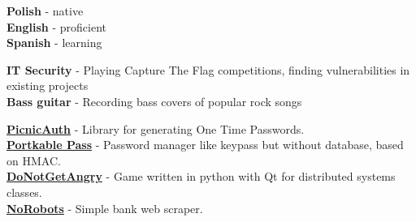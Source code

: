 \documentclass[9pt]{developercv} %
\begin{document}
\begin{minipage}[t]{0.2\textwidth}
	\vspace{-\baselineskip} %


	\textbf{Polish} - native\\
	\textbf{English} - proficient\\
	\textbf{Spanish} - learning
\end{minipage}
\hfill
\begin{minipage}[t]{0.3\textwidth}
	\vspace{-\baselineskip} %


	\textbf{IT Security} - Playing Capture The Flag competitions, finding vulnerabilities in existing projects\\
	\textbf{Bass guitar} - Recording bass covers of popular rock songs
\end{minipage}
\hfill
\begin{minipage}[t]{0.4\textwidth}
	\vspace{-\baselineskip} %


    
    
    
    
	\textbf{\href{https://github.com/matishadow/PicnicAuth}{PicnicAuth}} - Library for generating One Time Passwords.\\
	\textbf{\href{https://github.com/matishadow/portkable-pass}{Portkable Pass}} - Password manager like keypass but without database, based on HMAC.\\
	\textbf{\href{https://github.com/matishadow/DoNotGetAngry}{DoNotGetAngry}} - Game written in python with Qt for distributed systems classes.\\
	\textbf{\href{https://github.com/matishadow/NoRobots}{NoRobots}} - Simple bank web scraper.
\end{minipage}

\end{document}
